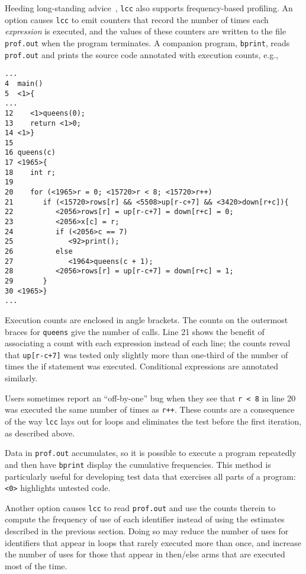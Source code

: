 Heeding long-standing advice~\cite{knuth71,sites78}, \verb|lcc| also supports
frequency-based profiling.
An option causes \verb|lcc| to emit counters that record the number
of times each {\em expression} is executed, and the values of these counters are
written to the file \verb|prof.out| when the program terminates.
A companion program, \verb|bprint|, reads \verb|prof.out| and prints
the source code annotated with execution counts, e.g.,
\begin{verbatim}
...
4  main()
5  <1>{
...
12    <1>queens(0);
13    return <1>0;
14 <1>}
15 
16 queens(c)
17 <1965>{
18    int r;
19 
20    for (<1965>r = 0; <15720>r < 8; <15720>r++)
21       if (<15720>rows[r] && <5508>up[r-c+7] && <3420>down[r+c]){
22          <2056>rows[r] = up[r-c+7] = down[r+c] = 0;
23          <2056>x[c] = r;
24          if (<2056>c == 7)
25             <92>print();
26          else
27             <1964>queens(c + 1);
28          <2056>rows[r] = up[r-c+7] = down[r+c] = 1;
29       }
30 <1965>}
...
\end{verbatim}
Execution counts are enclosed in angle brackets.
The counts on the outermost braces for \verb|queens|
give the number of calls.
Line 21 shows the benefit of associating a count
with each expression instead of each line;
the counts reveal that \verb|up[r-c+7]| was tested only slightly more than one-third
of the number of times the if statement was executed.
Conditional expressions are annotated similarly.

Users sometimes report an ``off-by-one'' bug when they see that
\verb|r < 8| in line 20 was executed
the same number of times as \verb|r++|.
These counts are a consequence of the way \verb|lcc| lays out for loops
and eliminates the test before the first iteration, as described above.

Data in \verb|prof.out| accumulates, so it is possible to execute
a program repeatedly and then have \verb|bprint| display the
cumulative frequencies.
This method is particularly useful for developing
test data that exercises all parts of a program:
\verb|<0>| highlights untested code.

Another option causes \verb|lcc| to read \verb|prof.out|
and use the counts therein to compute the frequency of use
of each identifier instead of using the estimates
described in the previous section. Doing so may reduce the
number of uses for identifiers that appear in
loops that rarely executed more than once,
and increase the number of uses for those that appear
in then/else arms that are executed most of the time.


